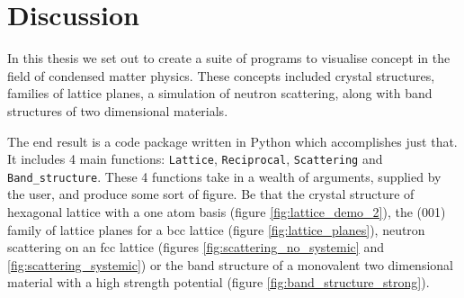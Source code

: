 \documentclass[main.tex]{subfiles}
\begin{document}
	\section{Discussion}
	In this thesis we set out to create a suite of programs to visualise concept in the field of condensed matter physics. These concepts included crystal structures, families of lattice planes, a simulation of neutron scattering, along with band structures of two dimensional materials.
	
	The end result is a code package written in Python which accomplishes just that. It includes 4 main functions: \texttt{Lattice}, \texttt{Reciprocal}, \texttt{Scattering} and \texttt{Band\_structure}. These 4 functions take in a wealth of arguments, supplied by the user, and produce some sort of figure. Be that the crystal structure of hexagonal lattice with a one atom basis (figure \ref{fig:lattice_demo_2}), the (001) family of lattice planes for a bcc lattice (figure \ref{fig:lattice_planes}), neutron scattering on an fcc lattice (figures \ref{fig:scattering_no_systemic} and \ref{fig:scattering_systemic}) or the band structure of a monovalent two dimensional material with a high strength potential (figure \ref{fig:band_structure_strong}).
	
	
	
\end{document}
